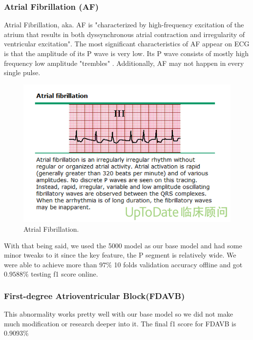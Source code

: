 \documentclass[runningheads]{llncs}
\begin{document}
\subsubsection{Atrial Fibrillation (AF)}
Atrial Fibrillation, aka. AF is "characterized by high-frequency excitation of the atrium that results in both dyssynchronous atrial contraction and irregularity of ventricular excitation"\cite{Staerk}. The most significant characteristics of AF appear on ECG is that the amplitude of its P wave is very low. Its P wave consists of mostly high frequency low amplitude "trembles" \cite{Husser}. Additionally, AF may not happen in every single pulse.
\begin{figure}[H]
	\includegraphics[width=\linewidth]{img/AF.png}
	\caption{\label{fig:AF} Atrial Fibrillation. \cite{Kumar}}
\end{figure}
With that being said, we used the 5000 model as our base model and had some minor tweaks to it since the key feature, the P segment is relatively wide. We were able to achieve more than $97\%$ 10 folds validation accuracy offline and got $0.9588\%$ testing f1 score online.

\subsubsection{First-degree Atrioventricular Block(FDAVB)}
This abnormality works pretty well with our base model so we did not make much modification or research deeper into it. The final f1 score for FDAVB is $0.9093\%$
\end{document}
